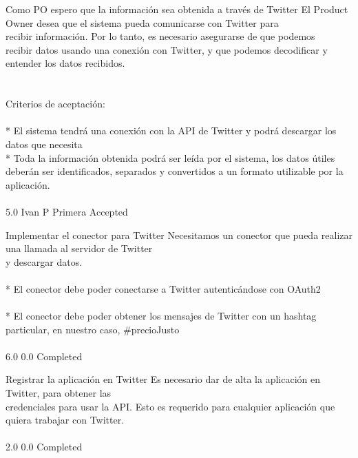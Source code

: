 \vspace{20pt}

	{Como PO espero que la información sea obtenida a través de Twitter} %
	{El Product Owner desea que el sistema pueda comunicarse con Twitter para\\
recibir información. Por lo tanto, es necesario asegurarse de que podemos\\
recibir datos usando una conexión con Twitter, y que podemos decodificar y\\
entender los datos recibidos.\\
\\
  \\
Criterios de aceptación:\\
\\
* El sistema tendrá una conexión con la API de Twitter y podrá descargar los datos que necesita  \\
* Toda la información obtenida podrá ser leída por el sistema, los datos útiles deberán ser identificados, separados y convertidos a un formato utilizable por la aplicación.\\
\\
} %
	{} %
	{5.0} %
	{Ivan P} %
	{Primera} %
	{Accepted} %

		{Implementar el conector para Twitter} %
		{Necesitamos un conector que pueda realizar una llamada al servidor de Twitter\\
y descargar datos.\\
\\
* El conector debe poder conectarse a Twitter autenticándose con OAuth2\\
\\
* El conector debe poder obtener los mensajes de Twitter con un hashtag particular, en nuestro caso, #precioJusto\\
\\
} %
		{6.0} %
		{} %
		{0.0} %
		{Completed} %

		{Registrar la aplicación en Twitter} %
		{Es necesario dar de alta la aplicación en Twitter, para obtener las\\
credenciales para usar la API. Esto es requerido para cualquier aplicación que\\
quiera trabajar con Twitter.\\
\\
} %
		{2.0} %
		{} %
		{0.0} %
		{Completed} %

